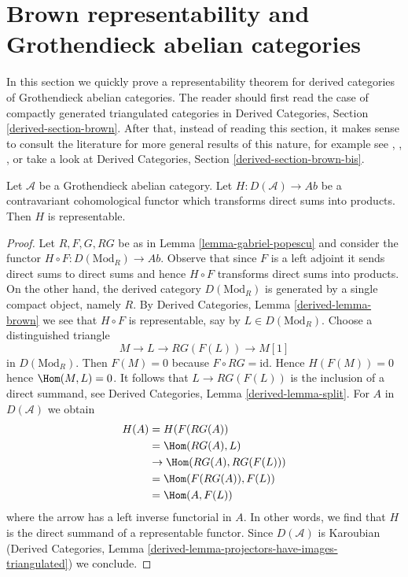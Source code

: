 \section{Brown representability and Grothendieck abelian categories}
\label{section-brown}

\noindent
In this section we quickly prove a representability theorem for
derived categories of Grothendieck abelian categories. The reader should
first read the case of compactly generated triangulated categories in
Derived Categories, Section \ref{derived-section-brown}.
After that, instead of reading this section,
it makes sense to consult the literature for more
general results of this nature, for example see
\cite{Franke}, \cite{Neeman}, \cite{Krause}, or take
a look at Derived Categories, Section \ref{derived-section-brown-bis}.

\begin{lemma}
\label{lemma-brown}
Let $\mathcal{A}$ be a Grothendieck abelian category.
Let $H : D(\mathcal{A}) \to \textit{Ab}$ be a contravariant
cohomological functor which transforms direct sums into products.
Then $H$ is representable.
\end{lemma}

\begin{proof}
Let $R, F, G, RG$ be as in Lemma \ref{lemma-gabriel-popescu}
and consider the functor $H \circ F : D(\text{Mod}_R) \to \textit{Ab}$.
Observe that since $F$ is a left adjoint it sends direct sums to
direct sums and hence $H \circ F$ transforms direct sums into products.
On the other hand, the derived category $D(\text{Mod}_R)$ is
generated by a single compact object, namely $R$.
By Derived Categories, Lemma \ref{derived-lemma-brown}
we see that $H \circ F$ is representable, say by $L \in D(\text{Mod}_R)$.
Choose a distinguished triangle
$$
M \to L \to RG(F(L)) \to M[1]
$$
in $D(\text{Mod}_R)$. Then $F(M) = 0$ because $F \circ RG = \text{id}$.
Hence $H(F(M)) = 0$ hence $\Hom(M, L) = 0$.
It follows that $L \to RG(F(L))$ is the inclusion of a direct summand, see
Derived Categories, Lemma \ref{derived-lemma-split}.
For $A$ in $D(\mathcal{A})$ we obtain
\begin{align*}
H(A)
& =
H(F(RG(A)) \\
& =
\Hom(RG(A), L) \\
& \to
\Hom(RG(A), RG(F(L))) \\
& =
\Hom(F(RG(A)), F(L)) \\
& =
\Hom(A, F(L))
\end{align*}
where the arrow has a left inverse functorial in $A$. In other words, we find
that $H$ is the direct summand of a representable functor.
Since $D(\mathcal{A})$ is Karoubian
(Derived Categories, Lemma
\ref{derived-lemma-projectors-have-images-triangulated}) we conclude.
\end{proof}

